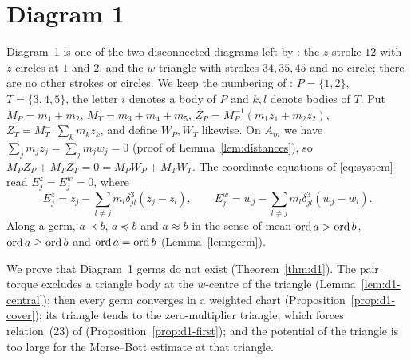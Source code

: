\section{Diagram 1}\label{sec:d1}

Diagram~1 is one of the two disconnected diagrams left by \cite[\S7.1, p.~565]{AK}: the
$z$-stroke $12$ with $z$-circles at $1$ and $2$, and the $w$-triangle with strokes $34,35,45$ and
no circle; there are no other strokes or circles.
We keep the numbering of \cite[\S8.1]{AK}: $P=\{1,2\}$, $T=\{3,4,5\}$, the letter $i$ denotes a
body of $P$ and $k,l$ denote bodies of $T$.  Put $M_P=m_1+m_2$, $M_T=m_3+m_4+m_5$,
$Z_P=M_P^{-1}(m_1z_1+m_2z_2)$, $Z_T=M_T^{-1}\sum_km_kz_k$, and define $W_P,W_T$ likewise.  On
$A_m$ we have $\sum_jm_jz_j=\sum_jm_jw_j=0$ (proof of Lemma~\ref{lem:distances}), so
$M_PZ_P+M_TZ_T=0=M_PW_P+M_TW_T$.  The coordinate equations of \eqref{eq:system} read
$E^z_j=E^w_j=0$, where
\[
  E^z_j=z_j-\sum_{l\ne j}m_l\delta_{jl}^3(z_j-z_l),\qquad
  E^w_j=w_j-\sum_{l\ne j}m_l\delta_{jl}^3(w_j-w_l).
\]
Along a germ, $a\prec b$, $a\preccurlyeq b$ and $a\approx b$ in the sense of \cite[\S3]{AK} mean
$\operatorname{ord} a>\operatorname{ord} b$, $\operatorname{ord} a\ge\operatorname{ord} b$ and $\operatorname{ord} a=\operatorname{ord} b$ (Lemma~\ref{lem:germ}).

We prove that Diagram~1 germs do not exist (Theorem~\ref{thm:d1}).  The pair torque excludes a
triangle body at the $w$-centre of the triangle (Lemma~\ref{lem:d1-central}); then every germ
converges in a weighted chart (Proposition~\ref{prop:d1-cover}); its triangle tends to the
zero-multiplier triangle, which forces relation~(23) of \cite[\S8.1]{AK}
(Proposition~\ref{prop:d1-first}); and the potential of the triangle is too large for the
Morse--Bott estimate at that triangle.

